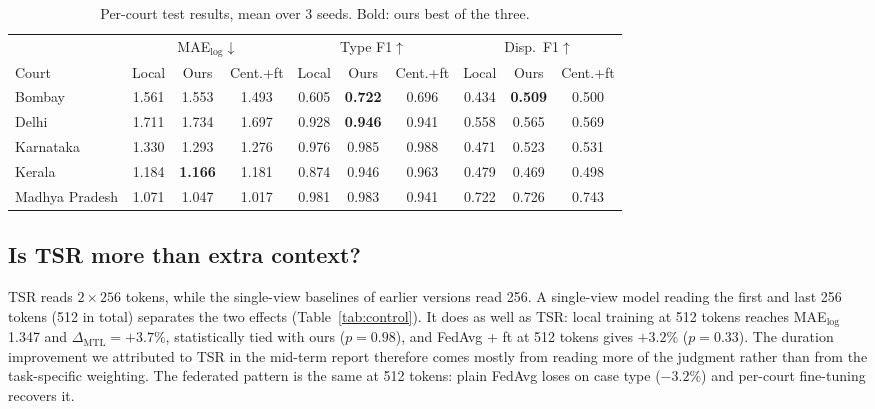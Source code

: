 \documentclass[11pt,a4paper]{article}
\newcommand{\dmtl}{\Delta_{\text{MTL}}}
\newcommand{\mae}{MAE$_{\log}$}
\begin{document}
\begin{table}[H]\centering\small
\setlength{\tabcolsep}{4.5pt}
\begin{tabular}{@{}l ccc ccc ccc@{}}\toprule
 & \multicolumn{3}{c}{\mae{}$\downarrow$} & \multicolumn{3}{c}{Type F1$\uparrow$} & \multicolumn{3}{c}{Disp.\ F1$\uparrow$} \\
\cmidrule(lr){2-4}\cmidrule(lr){5-7}\cmidrule(lr){8-10}
Court & Local & Ours & Cent.+ft & Local & Ours & Cent.+ft & Local & Ours & Cent.+ft \\ \midrule
Bombay & 1.561 & 1.553 & 1.493 & 0.605 & \textbf{0.722} & 0.696 & 0.434 & \textbf{0.509} & 0.500 \\
Delhi & 1.711 & 1.734 & 1.697 & 0.928 & \textbf{0.946} & 0.941 & 0.558 & 0.565 & 0.569 \\
Karnataka & 1.330 & 1.293 & 1.276 & 0.976 & 0.985 & 0.988 & 0.471 & 0.523 & 0.531 \\
Kerala & 1.184 & \textbf{1.166} & 1.181 & 0.874 & 0.946 & 0.963 & 0.479 & 0.469 & 0.498 \\
Madhya Pradesh & 1.071 & 1.047 & 1.017 & 0.981 & 0.983 & 0.941 & 0.722 & 0.726 & 0.743 \\ \bottomrule
\end{tabular}
\caption{Per-court test results, mean over 3 seeds. Bold: ours best of the three.}
\label{tab:percourt}
\end{table}

\subsection{Is TSR more than extra context?}
TSR reads $2\times256$ tokens, while the single-view baselines of earlier versions read 256. A
single-view model reading the first and last 256 tokens (512 in total) separates the two effects
(Table~\ref{tab:control}). It does as well as TSR: local training at 512 tokens reaches \mae{} 1.347
and $\dmtl=+3.7\%$, statistically tied with ours ($p=0.98$), and FedAvg + ft at 512 tokens gives
$+3.2\%$ ($p=0.33$). The duration improvement we attributed to TSR in the mid-term report therefore
comes mostly from reading more of the judgment rather than from the task-specific weighting. The
federated pattern is the same at 512 tokens: plain FedAvg loses on case type ($-3.2\%$) and per-court
fine-tuning recovers it.
\end{document}
